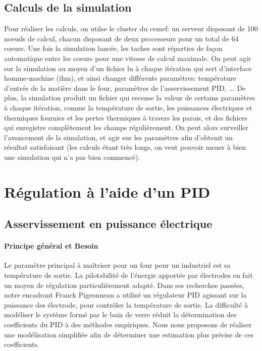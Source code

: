 \documentclass[12pt, a4paper, french, BCOR = 0pt, DIV = 10]{scrartcl}
\begin{document}
    \subsection{Calculs de la simulation}
    Pour réaliser les calculs, on utilse le cluster du cemef: un serveur disposant de 100 noeuds de calcul, chacun disposant de deux processeurs pour un total de 64 coeurs. Une fois la simulation lancée, les taches sont réparties de façon automatique entre les coeurs pour une vitesse de calcul maximale. On peut agir sur la simulation au moyen d'un fichier lu à chaque itération qui sert d'interface homme-machine (ihm), et ainsi changer différents paramètres: température d'entrée de la matière dans le four, paramètres de l'asservissement PID, ... De plus, la simulation produit un fichier qui recense la valeur de certains paramètres à chaque itération, comme la température de sortie, les puissances électriques et thermiques fournies et les pertes thermiques à travers les parois, et des fichiers qui enregistre complètement les champs régulièrement. On peut alors surveiller l'avancement de la simulation, et agir sur les paramètres afin d'obtenit un résultat satisfaisant (les calculs étant très longs, on veut pouvoir mener à bien une simulation qui n'a pas bien commencé).


    \section{Régulation à l'aide d'un PID}
    \subsection{Asservissement en puissance électrique}
    \paragraph{Principe général et Besoin}

    Le paramètre principal à maîtriser pour un four pour un industriel est sa température de sortie. La pilotabilité de l'énergie apportée par électrodes en fait un moyen de régulation particulièrement adapté. Dans ses recherches passées, notre encadrant Franck Pigeonneau a utilisé un régulateur PID agissant sur la puissance des électrode, pour contrôler la température de sortie. La difficulté à modéliser le système formé par le bain de verre réduit la détermination des coefficients du PID à des méthodes empiriques. Nous nous proposons de réaliser une modélisation simplifiée afin de déterminer une estimation plus précise de ces coefficients.
\end{document}
